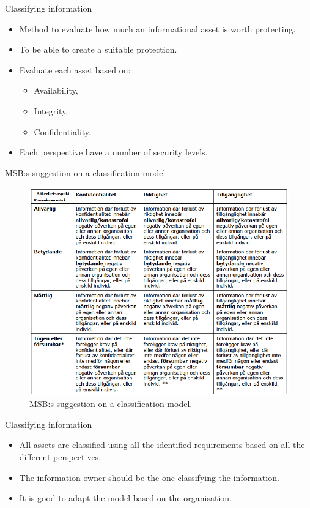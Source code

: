 \documentclass{beamer}
\begin{document}
\begin{frame}{Classifying information}
  \begin{itemize}
    \item Method to evaluate how much an informational asset is worth
      protecting.

    \item To be able to create a suitable protection.

    \item Evaluate each asset based on:
      \begin{itemize}
        \item Availability,
        \item Integrity,
        \item Confidentiality.
      \end{itemize}

    \item Each perspective have a number of security levels.

  \end{itemize}
\end{frame}

\begin{frame}{MSB:s suggestion on a classification model}
  \begin{figure}
    \includegraphics[height=0.7\textheight]{msb-klassificering.png}
    \caption{MSB:s suggestion on a classification model.}
  \end{figure}
\end{frame}

\begin{frame}{Classifying information}
  \begin{itemize}
    \item All assets are classified using all the identified requirements based
      on all the different perspectives.
    \item The information owner should be the one classifying the information.
    \item It is good to adapt the model based on the organisation.
  \end{itemize}
\end{frame}
\end{document}
